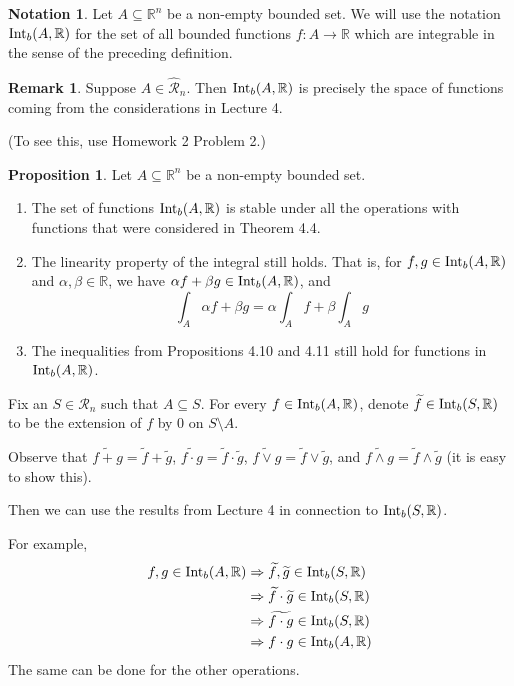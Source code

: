 \documentclass[11pt]{article}
\makeatletter
\theoremstyle{definition}
\newtheorem{prop}[thm]{Proposition}
\newtheorem{remark}[thm]{Remark}
\newtheorem{notation}[thm]{Notation}
\newcommand{\R}{\ensuremath{\mathbb{R}}}
\newenvironment{pf}[1][\proofname]{\par
  \pushQED{\qed}%
  \normalfont \topsep0\p@\relax
  \trivlist
  \item[\hskip\labelsep\itshape
  #1\@addpunct{.}]\ignorespaces
}{%
  \popQED\endtrivlist\@endpefalse
}
\makeatother
\begin{document}
\begin{notation}
Let $A \subseteq \R^n$ be a non-empty bounded set. We will use the notation ${\rm Int}_b(A, \R)$ for the set of all bounded functions $f: A \to \R$ which are integrable in the sense of the preceding definition.
\end{notation}

\begin{remark}
Suppose $A \in \widehat{\mathcal{R}}_n$. Then ${\rm Int}_b(A, \R)$ is precisely the space of functions coming from the considerations in Lecture 4.

(To see this, use Homework 2 Problem 2.)
\end{remark}

\begin{prop}
Let $A \subseteq \R^n$ be a non-empty bounded set. \vspace{-1.5ex}
\begin{enumerate}[(1)]
\item The set of functions ${\rm Int}_b(A, \R)$ is stable under all the operations with functions that were considered in Theorem 4.4.
\item The linearity property of the integral still holds. That is, for $f, g \in {\rm Int}_b(A, \R)$ and $\alpha, \beta \in \R$, we have $\alpha f + \beta g \in {\rm Int}_b(A, \R)$, and
$$\int_A \alpha f + \beta g = \alpha \int_A f + \beta \int_A g$$
\item The inequalities from Propositions 4.10 and 4.11 still hold for functions in ${\rm Int}_b (A, \R)$.
\end{enumerate}
\end{prop}
\begin{pf}
Fix an $S \in \mathcal{R}_n$ such that $A \subseteq S$. For every $f \in {\rm Int}_b(A, \R)$, denote $\widetilde{f} \in {\rm Int}_b(S, \R)$ to be the extension of $f$ by 0 on $S \setminus A$.

Observe that $\widetilde{f+g} = \widetilde{f} + \widetilde{g}$, $\widetilde{f \cdot g} = \widetilde{f} \cdot \widetilde{g}$, $\widetilde{f \vee g} = \widetilde{f} \vee \widetilde{g}$, and $\widetilde{f \wedge g} = \widetilde{f} \wedge \widetilde{g}$ (it is easy to show this).

Then we can use the results from Lecture 4 in connection to ${\rm Int}_b(S, \R)$.

For example,
\begin{align*}
    f, g \in {\rm Int}_b(A, \R)
    &\Rightarrow \widetilde{f}, \widetilde{g} \in {\rm Int}_b(S, \R) \\
    &\Rightarrow \widetilde{f} \cdot \widetilde{g} \in {\rm Int}_b(S, \R) \\
    &\Rightarrow \widetilde{f \cdot g} \in {\rm Int}_b(S, \R) \\
    &\Rightarrow f \cdot g \in {\rm Int}_b(A, \R) 
\end{align*}
The same can be done for the other operations.
\end{pf}
\end{document}
